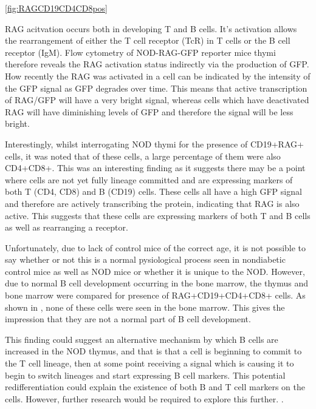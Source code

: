 \cref{fig:RAGCD19CD4CD8pos}

RAG acitvation occurs both in developing T and B cells.
It's activation allows the rearrangement of either the T cell receptor (TcR) in T cells or the B cell receptor (IgM).
Flow cytometry of NOD-RAG-GFP reporter mice thymi therefore reveals the RAG activation status indirectly via the production of GFP.
How recently the RAG was activated in a cell can be indicated by the intensity of the GFP signal as GFP degrades over time.
This means that active transcription of RAG/GFP will have a very bright signal, whereas cells which have deactivated RAG will have diminishing levels of GFP and therefore the signal will be less bright.

Interestingly, whilst interrogating NOD thymi for the presence of CD19+RAG+ cells, it was noted that of these cells, a large percentage of them were also CD4+CD8+.
This was an interesting finding as it suggests there may be a point where cells are not yet fully lineage committed and are expressing markers of both T (CD4, CD8) and B (CD19) cells.
These cells all have a high GFP signal and therefore are actively transcribing the protein, indicating that RAG is also active.
This suggests that these cells are expressing markers of both T and B cells as well as rearranging a receptor.

Unfortunately, due to lack of control mice of the correct age, it is not possible to say whether or not this is a normal pysiological process seen in nondiabetic control mice as well as NOD mice or whether it is unique to the NOD.
However, due to normal B cell development occurring in the bone marrow, the thymus and bone marrow were compared for presence of RAG+CD19+CD4+CD8+ cells.
As shown in , none of these cells were seen in the bone marrow. 
This gives the impression that they are not a normal part of B cell development.

This finding could suggest an alternative mechanism by which B cells are increased in the NOD thymus, and that is that a cell is beginning to commit to the T cell lineage, then at some point receiving a signal which is causing it to begin to switch lineages and start expressing B cell markers.
This potential redifferentiation could explain the existence of both B and T cell markers on the cells. 
However, further research would be required to explore this further. .

